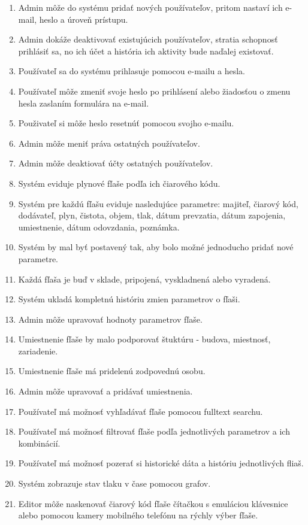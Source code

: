 \documentclass[hreffootnote]{zah}
\begin{document}
\begin{enumerate}
\item Admin môže do systému pridať nových používateľov, pritom nastaví ich e-mail, heslo a úroveň prístupu.
\item Admin dokáže deaktivovať existujúcich používateľov, stratia schopnosť prihlásiť sa, no ich účet a história ich aktivity bude naďalej existovať.
\item Používateľ sa do systému prihlasuje pomocou e-mailu a hesla.
\item Používateľ môže zmeniť svoje heslo po prihlásení alebo žiadosťou o zmenu hesla zaslaním formulára na e-mail.
\item Použivateľ si môže heslo resetnúť pomocou svojho e-mailu.
\item Admin môže meniť práva ostatných používateľov.
\item Admin môže deaktiovať účty ostatných používateľov.
\item Systém eviduje plynové fľaše podľa ich čiarového kódu.
\item Systém pre každú fľašu eviduje nasledujúce parametre: majiteľ, čiarový kód, dodávateľ, plyn, čistota, objem, tlak, dátum prevzatia, dátum zapojenia, umiestnenie, dátum odovzdania, poznámka.
\item Systém by mal byť postavený tak, aby bolo možné jednoducho pridať nové parametre.
\item Každá fľaša je buď v sklade, pripojená, vyskladnená alebo vyradená.
\item Systém ukladá kompletnú históriu zmien parametrov o fľaši.
\item Admin môže upravovať hodnoty parametrov fľaše.
\item Umiestnenie fľaše by malo podporovať štuktúru - budova, miestnosť, zariadenie.
\item Umiestnenie fľaše má pridelenú zodpovednú osobu.
\item Admin môže upravovať a pridávať umiestnenia.
\item Používateľ má možnosť vyhľadávať fľaše pomocou fulltext searchu.
\item Používateľ má možnosť filtrovať fľaše podľa jednotlivých parametrov a ich kombinácií.
\item Používateľ má možnosť pozerať si historické dáta a históriu jednotlivých fliaš.
\item Systém zobrazuje stav tlaku v čase pomocou grafov.
\item Editor môže naskenovať čiarový kód fľaše čítačkou s emuláciou klávesnice alebo pomocou kamery mobilného telefónu na rýchly výber fľaše.

\end{enumerate}
\end{document}
